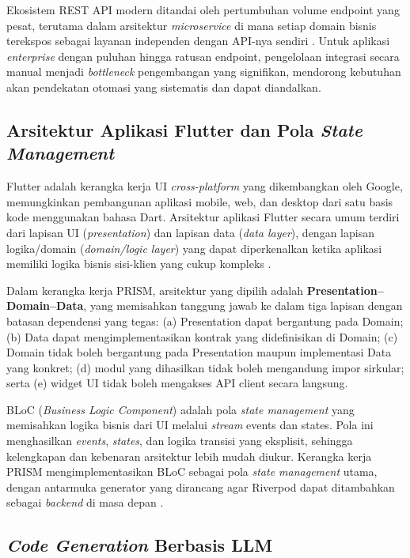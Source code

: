 Ekosistem REST API modern ditandai oleh pertumbuhan volume endpoint yang pesat, terutama dalam arsitektur \textit{microservice} di mana setiap domain bisnis terekspos sebagai layanan independen dengan API-nya sendiri \cite{lercher2024}. Untuk aplikasi \textit{enterprise} dengan puluhan hingga ratusan endpoint, pengelolaan integrasi secara manual menjadi \textit{bottleneck} pengembangan yang signifikan, mendorong kebutuhan akan pendekatan otomasi yang sistematis dan dapat diandalkan.

\subsection{Arsitektur Aplikasi Flutter dan Pola \textit{State Management}}

Flutter adalah kerangka kerja UI \textit{cross-platform} yang dikembangkan oleh Google, memungkinkan pembangunan aplikasi mobile, web, dan desktop dari satu basis kode menggunakan bahasa Dart. Arsitektur aplikasi Flutter secara umum terdiri dari lapisan UI (\textit{presentation}) dan lapisan data (\textit{data layer}), dengan lapisan logika/domain (\textit{domain/logic layer}) yang dapat diperkenalkan ketika aplikasi memiliki logika bisnis sisi-klien yang cukup kompleks \cite{flutter2026}.

Dalam kerangka kerja PRISM, arsitektur yang dipilih adalah \textbf{Presentation--Domain--Data}, yang memisahkan tanggung jawab ke dalam tiga lapisan dengan batasan dependensi yang tegas: (a) Presentation dapat bergantung pada Domain; (b) Data dapat mengimplementasikan kontrak yang didefinisikan di Domain; (c) Domain tidak boleh bergantung pada Presentation maupun implementasi Data yang konkret; (d) modul yang dihasilkan tidak boleh mengandung impor sirkular; serta (e) widget UI tidak boleh mengakses API client secara langsung.

BLoC (\textit{Business Logic Component}) adalah pola \textit{state management} yang memisahkan logika bisnis dari UI melalui \textit{stream} events dan states. Pola ini menghasilkan \textit{events}, \textit{states}, dan logika transisi yang eksplisit, sehingga kelengkapan dan kebenaran arsitektur lebih mudah diukur. Kerangka kerja PRISM mengimplementasikan BLoC sebagai pola \textit{state management} utama, dengan antarmuka generator yang dirancang agar Riverpod dapat ditambahkan sebagai \textit{backend} di masa depan \cite{mahmoud2024}.

\subsection{\textit{Code Generation} Berbasis LLM}

